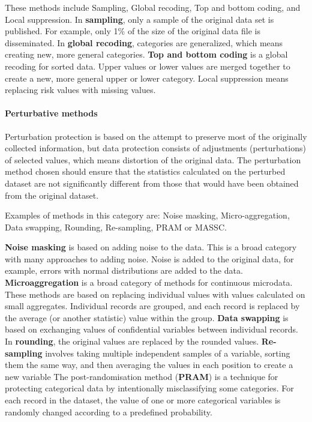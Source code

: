 \documentclass{article}
\begin{document}
These methods include Sampling, Global recoding, Top and bottom coding, and Local suppression. 
In \textbf{sampling}, only a sample of the original data set is published. For example, only 1\% of the size of the original data file is disseminated. In \textbf{global recoding}, categories are generalized, which means creating new, more general categories. \textbf{Top and bottom coding} is a global recoding for sorted data. Upper values or lower values are merged together to create a new, more general upper or lower category. Local suppression means replacing risk values with missing values. 

\paragraph{Perturbative methods}
Perturbation protection is based on the attempt to preserve most of the originally collected information, but data protection consists of adjustments (perturbations) of selected values, which means distortion of the original data. The perturbation method chosen should ensure that the statistics calculated on the perturbed dataset are not significantly different from those that would have been obtained from the original dataset.

Examples of methods in this category are: Noise masking, Micro-aggregation, Data swapping, Rounding, Re-sampling, PRAM or MASSC.

\textbf{Noise masking} is based on adding noise to the data. This is a broad category with many approaches to adding noise. Noise is added to the original data, for example, errors with normal distributions are added to the data. 
\textbf{Microaggregation} is a broad category of methods for continuous microdata. These methods are based on replacing individual values with values calculated on small aggregates. Individual records are grouped, and each record is replaced by the average (or another statistic) value within the group. \textbf{Data swapping} is based on exchanging values of confidential variables between individual records. In \textbf{rounding}, the original values are replaced by the rounded values. \textbf{Re-sampling} involves taking multiple independent samples of a variable, sorting them the same way, and then averaging the values in each position to create a new variable
The post-randomisation method (\textbf{PRAM}) is a technique for protecting categorical data by intentionally misclassifying some categories. For each record in the dataset, the value of one or more categorical variables is randomly changed according to a predefined probability.
\end{document}

